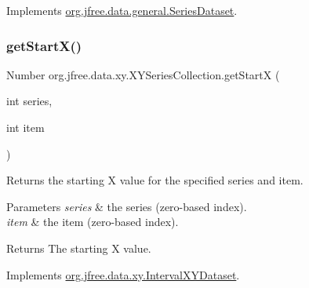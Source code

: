 Implements \mbox{\hyperlink{interfaceorg_1_1jfree_1_1data_1_1general_1_1_series_dataset_a60488892b2314a05a012999e26a74178}{org.\+jfree.\+data.\+general.\+Series\+Dataset}}.

\mbox{\label{classorg_1_1jfree_1_1data_1_1xy_1_1_x_y_series_collection_a6dc884bc2770f807b86b560a025f708b}} 
\subsubsection{\texorpdfstring{get\+Start\+X()}{getStartX()}}
{\footnotesize\ttfamily Number org.\+jfree.\+data.\+xy.\+X\+Y\+Series\+Collection.\+get\+StartX (\begin{DoxyParamCaption}\item[{int}]{series,  }\item[{int}]{item }\end{DoxyParamCaption})}

Returns the starting X value for the specified series and item.


\begin{DoxyParams}{Parameters}
{\em series} & the series (zero-\/based index). \\
\hline
{\em item} & the item (zero-\/based index).\\
\hline
\end{DoxyParams}
\begin{DoxyReturn}{Returns}
The starting X value. 
\end{DoxyReturn}


Implements \mbox{\hyperlink{interfaceorg_1_1jfree_1_1data_1_1xy_1_1_interval_x_y_dataset_a7548ec7d60d72463313dc6f10aceee62}{org.\+jfree.\+data.\+xy.\+Interval\+X\+Y\+Dataset}}.

\mbox{\label{classorg_1_1jfree_1_1data_1_1xy_1_1_x_y_series_collection_acfaf042a69d421089ae292ec591e7799}} 
